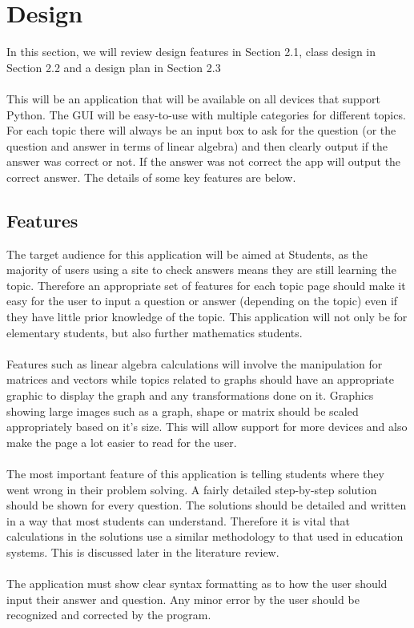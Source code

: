 \documentclass[final]{cmpreport}
\begin{document}
	\section{Design} \label{sec:design1}
	In this section, we will review design features in Section 2.1, class design in Section 2.2 and a design plan in Section 2.3\\
	\\This will be an application that will be available on all devices that support Python. The GUI will be easy-to-use with multiple categories for different topics. For each topic there will always be an input box to ask for the question (or the question and answer in terms of linear algebra) and then clearly output if the answer was correct or not. If the answer was not correct the app will output the correct answer. The details of some key features are below.\\
	

	
	\subsection{Features}
	The target audience for this application will be aimed at Students, as the majority of users using a site to check answers means they are still learning the topic. Therefore an appropriate set of features for each topic page should make it easy for the user to input a question or answer (depending on the topic) even if they have little prior knowledge of the topic. This application will not only be for elementary students, but also further mathematics students.\\
	\\Features such as linear algebra calculations will involve the manipulation for matrices and vectors while topics related to graphs should have an appropriate graphic to display the graph and any transformations done on it. Graphics showing large images such as a graph, shape or matrix should be scaled appropriately based on it's size. This will allow support for more devices and also make the page a lot easier to read for the user.\\
	\\The most important feature of this application is telling students where they went wrong in their problem solving. A fairly detailed step-by-step solution should be shown for every question. The solutions should be detailed and written in a way that most students can understand. Therefore it is vital that calculations in the solutions use a similar methodology to that used in education systems. This is discussed later in the literature review.\\
	\\The application must show clear syntax formatting as to how the user should input their answer and question. Any minor error by the user should be recognized and corrected by the program.
	
\end{document}
